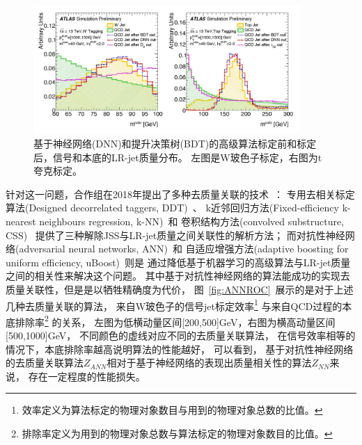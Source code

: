 \begin{figure}
  \begin{center}
    \includegraphics[width=0.9\textwidth]{figuresXbb/MSCULP.jpg}
  \end{center}
  \caption{
基于神经网络(DNN)和提升决策树(BDT)的高级算法标定前和标定后，信号和本底的LR-jet质量分布。
左图是W玻色子标定，右图为t夸克标定。
  }
    \label{fig:MSCULP}
\end{figure}



针对这一问题，合作组在2018年提出了多种去质量关联的技术~\cite{ATL-PHYS-PUB-2018-014}：
专用去相关标定算法(Designed decorrelated taggers, DDT)~\cite{DDT}、
k近邻回归方法(Fixed-efficiency k-nearest neighbours regression, k-NN)~\cite{KNN}和
卷积结构方法(convolved substructure, CSS)~\cite{CSS}
提供了三种解除JSS与LR-jet质量之间关联性的解析方法；
而对抗性神经网络(adversarial neural networks, ANN)~\cite{ANN}和
自适应增强方法(adaptive boosting for uniform efficiency, uBoost)~\cite{UBOOST}则是
通过降低基于机器学习的高级算法与LR-jet质量之间的相关性来解决这个问题。
其中基于对抗性神经网络的算法能成功的实现去质量关联性，但是是以牺牲精确度为代价，
图~\ref{fig:ANNROC}~展示的是对于上述几种去质量关联的算法，
来自W玻色子的信号jet标定效率\footnote{效率定义为算法标定的物理对象数目与用到的物理对象总数的比值。}
与来自QCD过程的本底排除率\footnote{排除率定义为用到的物理对象总数与算法标定的物理对象数目的比值。}
的关系，
左图为低横动量区间[200,500]GeV，右图为横高动量区间[500,1000]GeV，
不同颜色的虚线对应不同的去质量关联算法，
在信号效率相等的情况下，本底排除率越高说明算法的性能越好，
可以看到，
基于对抗性神经网络的去质量关联算法$Z_{ANN}$相对于基于神经网络的表现出质量相关性的算法$Z_{NN}$来说，
存在一定程度的性能损失。



